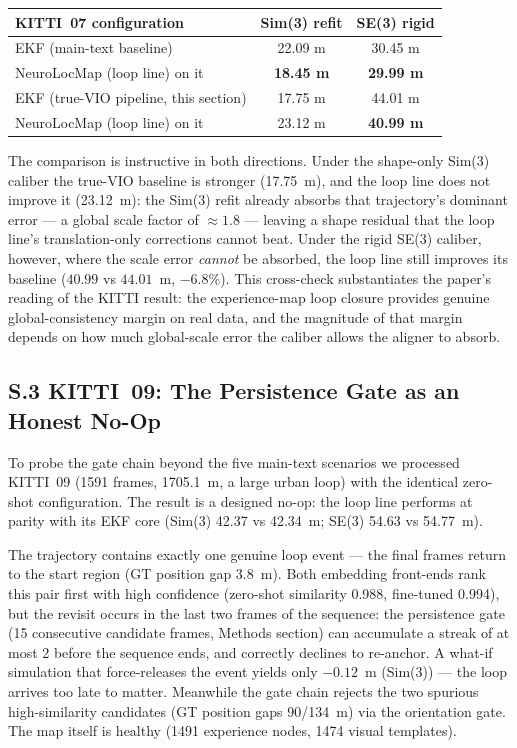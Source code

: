 \begin{center}
\scriptsize
\setlength{\tabcolsep}{3.5pt}
\begin{tabular}{@{}lcc@{}}
\toprule
KITTI~07 configuration & Sim(3) refit & SE(3) rigid \\
\midrule
EKF (main-text baseline)          & 22.09 m & 30.45 m \\
NeuroLocMap (loop line) on it     & \textbf{18.45 m} & \textbf{29.99 m} \\
\midrule
EKF (true-VIO pipeline, this section) & 17.75 m & 44.01 m \\
NeuroLocMap (loop line) on it     & 23.12 m & \textbf{40.99 m} \\
\bottomrule
\end{tabular}
\end{center}

The comparison is instructive in both directions. Under the shape-only Sim(3) caliber the true-VIO baseline is stronger (17.75~m), and the loop line does not improve it (23.12~m): the Sim(3) refit already absorbs that trajectory's dominant error --- a global scale factor of $\approx1.8$ --- leaving a shape residual that the loop line's translation-only corrections cannot beat. Under the rigid SE(3) caliber, however, where the scale error \emph{cannot} be absorbed, the loop line still improves its baseline ($40.99$ vs $44.01$~m, $-6.8\%$). This cross-check substantiates the paper's reading of the KITTI result: the experience-map loop closure provides genuine global-consistency margin on real data, and the magnitude of that margin depends on how much global-scale error the caliber allows the aligner to absorb.

\subsection*{S.3 KITTI~09: The Persistence Gate as an Honest No-Op}

To probe the gate chain beyond the five main-text scenarios we processed KITTI~09 (1591 frames, 1705.1~m, a large urban loop) with the identical zero-shot configuration. The result is a designed no-op: the loop line performs at parity with its EKF core (Sim(3) 42.37 vs 42.34~m; SE(3) 54.63 vs 54.77~m).

The trajectory contains exactly one genuine loop event --- the final frames return to the start region (GT position gap 3.8~m). Both embedding front-ends rank this pair first with high confidence (zero-shot similarity 0.988, fine-tuned 0.994), but the revisit occurs in the last two frames of the sequence: the persistence gate (15 consecutive candidate frames, Methods section) can accumulate a streak of at most 2 before the sequence ends, and correctly declines to re-anchor. A what-if simulation that force-releases the event yields only $-0.12$~m (Sim(3)) --- the loop arrives too late to matter. Meanwhile the gate chain rejects the two spurious high-similarity candidates (GT position gaps 90/134~m) via the orientation gate. The map itself is healthy (1491 experience nodes, 1474 visual templates).

